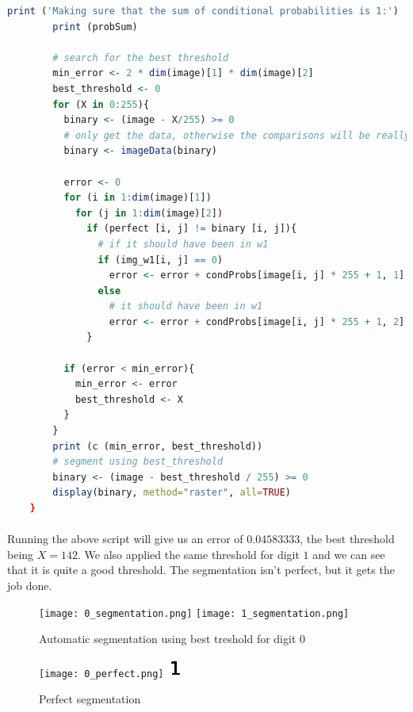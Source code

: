 \begin{lstlisting}[language=R, caption=Automatic segmentation for digit 0]
        print ('Making sure that the sum of conditional probabilities is 1:')
        print (probSum)
      
        # search for the best threshold
        min_error <- 2 * dim(image)[1] * dim(image)[2]
        best_threshold <- 0
        for (X in 0:255){
          binary <- (image - X/255) >= 0
          # only get the data, otherwise the comparisons will be really slow
          binary <- imageData(binary)
          
          error <- 0
          for (i in 1:dim(image)[1])
            for (j in 1:dim(image)[2])
              if (perfect [i, j] != binary [i, j]){
                # if it should have been in w1
                if (img_w1[i, j] == 0)
                  error <- error + condProbs[image[i, j] * 255 + 1, 1] * probs[1]
                else
                  # it should have been in w1
                  error <- error + condProbs[image[i, j] * 255 + 1, 2] * probs[2]
              }
          
          if (error < min_error){
            min_error <- error
            best_threshold <- X
          }
        }
        print (c (min_error, best_threshold))
        # segment using best_threshold
        binary <- (image - best_threshold / 255) >= 0
        display(binary, method="raster", all=TRUE)
    }
\end{lstlisting}

\clearpage

\paragraph{}
Running the above script will give us an error of $0.04583333$, the best threshold being $X=142$.
We also applied the same threshold for digit $1$ and we can see that it is quite a good threshold.
The segmentation isn't perfect, but it gets the job done.

\begin{figure}[h]
    \centering
    \texttt{[image: 0\_segmentation.png]}
    \texttt{[image: 1\_segmentation.png]}
    \caption{Automatic segmentation using best treshold for digit $0$}
    \label{}
\end{figure}

\begin{figure}[h]
    \centering
    \texttt{[image: 0\_perfect.png]}
    \includegraphics[scale=3]{rdf-chiffre-1-8bits_classe_a_trouver.png}
    \caption{Perfect segmentation}
    \label{}
\end{figure}


